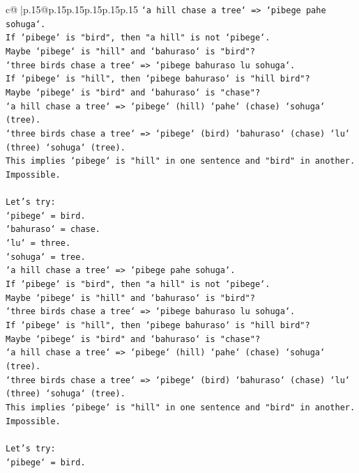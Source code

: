 \documentclass{article}
\begin{document}
{\begin{supertabular}{c@{$\;$}|p{.15\linewidth}@{}p{.15\linewidth}p{.15\linewidth}p{.15\linewidth}p{.15\linewidth}p{.15\linewidth}}
{{{\texttt{`a hill chase a tree` => `pibege pahe sohuga`.} \\
\texttt{If `pibege` is "bird", then "a hill" is not `pibege`.} \\
\texttt{Maybe `pibege` is "hill" and `bahuraso` is "bird"?} \\
\texttt{`three birds chase a tree` => `pibege bahuraso lu sohuga`.} \\
\texttt{If `pibege` is "hill", then `pibege bahuraso` is "hill bird"?} \\
\texttt{Maybe `pibege` is "bird" and `bahuraso` is "chase"?} \\
\texttt{`a hill chase a tree` => `pibege` (hill) `pahe` (chase) `sohuga` (tree).} \\
\texttt{`three birds chase a tree` => `pibege` (bird) `bahuraso` (chase) `lu` (three) `sohuga` (tree).} \\
\texttt{This implies `pibege` is "hill" in one sentence and "bird" in another. Impossible.} \\
\\ 
\texttt{Let's try:} \\
\texttt{`pibege` = bird.} \\
\texttt{`bahuraso` = chase.} \\
\texttt{`lu` = three.} \\
\texttt{`sohuga` = tree.} \\
\texttt{`a hill chase a tree` => `pibege pahe sohuga`.} \\
\texttt{If `pibege` is "bird", then "a hill" is not `pibege`.} \\
\texttt{Maybe `pibege` is "hill" and `bahuraso` is "bird"?} \\
\texttt{`three birds chase a tree` => `pibege bahuraso lu sohuga`.} \\
\texttt{If `pibege` is "hill", then `pibege bahuraso` is "hill bird"?} \\
\texttt{Maybe `pibege` is "bird" and `bahuraso` is "chase"?} \\
\texttt{`a hill chase a tree` => `pibege` (hill) `pahe` (chase) `sohuga` (tree).} \\
\texttt{`three birds chase a tree` => `pibege` (bird) `bahuraso` (chase) `lu` (three) `sohuga` (tree).} \\
\texttt{This implies `pibege` is "hill" in one sentence and "bird" in another. Impossible.} \\
\\ 
\texttt{Let's try:} \\
\texttt{`pibege` = bird.} \\
}}}
\end{supertabular}}
\end{document}
